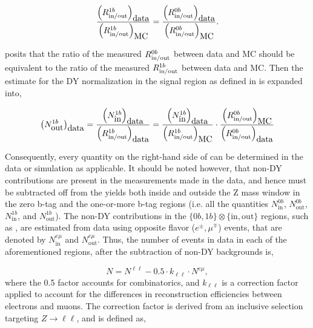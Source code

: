 \begin{equation}
  \frac{\left(R_\text{in/out}^{1b}\right)_{\mbox{data}}}{\left(R_\text{in/out}^{1b}\right)_{\mbox{MC}}} = 
  \frac{\left(R_\text{in/out}^{0b}\right)_{\mbox{data}}}{\left(R_\text{in/out}^{0b}\right)_{\mbox{MC}}}.
  \label{eq:Rassump}
\end{equation}

 posits that the ratio of the measured $R_\text{in/out}^{0b}$ between data and MC should be equivalent to the ratio of the measured $R_\text{in/out}^{1b}$ between data and MC. Then the estimate for the DY normalization in the signal region as defined in  is expanded into,

\begin{equation}
  \left(N^{1b}_{\mbox{out}}\right)_{\mbox{data}} =
  \frac{\left(N^{1b}_{\mbox{in}}\right)_{\mbox{data}}}{\left(R_\text{in/out}^{1b}\right)_{\mbox{data}}} = 
  \frac{\left(N^{1b}_{\mbox{in}}\right)_{\mbox{data}}}{\left(R_\text{in/out}^{1b}\right)_{\mbox{MC}}} \cdot 
  \frac{\left(R_\text{in/out}^{0b}\right)_{\mbox{MC}}}{\left(R_\text{in/out}^{0b}\right)_{\mbox{data}}}
  \label{eq:NDY_full}
\end{equation}

Consequently, every quantity on the right-hand side of  can be determined in the data or simulation as applicable. It should be noted however, that non-DY contributions are present in the measurements made in the data, and hence must be subtracted off from the yields both inside and outside the Z mass window in the zero b-tag and the one-or-more b-tag regions (i.e. all the quantities $N^{0b}_\text{in}$, $N^{0b}_\text{out}$, $N^{1b}_\text{in}$, and $N^{1b}_\text{out}$). The non-DY contributions in the $\{0b,1b\} \otimes \{\text{in},\text{out}\}$ regions, such as \ttll, are estimated from data using opposite flavor ($e^{\pm},\mu^{\mp}$) events, that are denoted by $N^{e\mu}_\text{in}$ and $N^{e\mu}_\text{out}$. Thus, the number of events in data in each of the aforementioned regions, after the subtraction of non-DY backgrounds is,

\begin{equation}
  N = N^{\ell\ell} - 0.5\cdot k_{\ell\ell} \cdot N^{e\mu},
\end{equation}
where the 0.5 factor accounts for combinatorics, and $k_{\ell\ell}$ is a correction factor applied to account for the differences in reconstruction efficiencies between electrons and muons. The correction factor is derived from an inclusive selection targeting $Z\rightarrow\ell\ell$, and is defined as,

